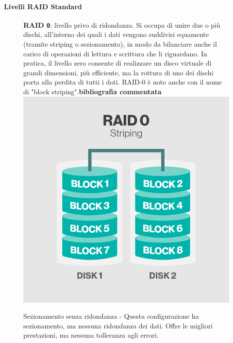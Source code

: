 \paragraph{Livelli RAID Standard}
\begin{itemize}
\begin{figure}[htbp]
\item 
\textbf{RAID \verb"O"}: livello privo di ridondanza. Si occupa di unire due o pi\`{u} dischi, all'interno dei quali i dati vengono suddivisi equamente (tramite striping o sezionamento), in modo da bilanciare anche il carico di operazioni di lettura e scrittura che li riguardano. In pratica, il livello zero consente di realizzare un disco virtuale di grandi dimensioni, pi\`{u} efficiente, ma la rottura di uno dei dischi porta alla perdita di tutti i dati. RAID-0 \`{e} noto anche con il nome di "block striping".\textbf{bibliografia commentata}\\

\centering
\includegraphics[scale=0.40]{img/raid00.png}\\
\caption{Sezionamento senza ridondanza - Questa configurazione ha sezionamento, ma nessuna ridondanza dei dati. Offre le migliori prestazioni, ma nessuna tolleranza agli errori.\label{figura1.3}\cite{etichetta9}}
\end{figure}


\end{itemize}
